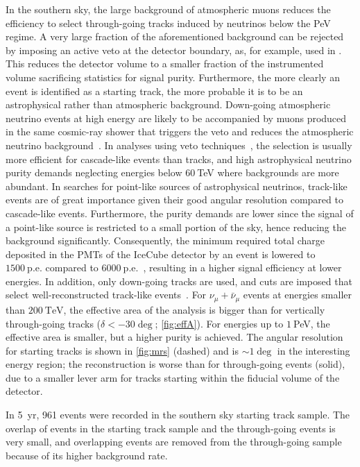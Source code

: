 \documentclass[aps,10pt,prd,twocolumn,floats,letterpaper,showpacs,nofootinbib,bibnotes,notitlepage,superscriptaddress]{revtex4-1}
\begin{document}
In the southern sky, the large background of atmospheric muons reduces the
efficiency to select through-going tracks induced by neutrinos below the PeV
regime. A very large fraction of the aforementioned background can be rejected
by imposing an active veto at the detector boundary, as, for example, used in
\cite{Aartsen:2013jdh}. This reduces the detector volume to a smaller fraction
of the instrumented volume sacrificing statistics for signal purity.
Furthermore, the more clearly an event is identified as a starting track, the
more probable it is to be an astrophysical rather than atmospheric background.
Down-going atmospheric neutrino events at high energy are likely to be
accompanied by muons produced in the same cosmic-ray shower that triggers the
veto and reduces the atmospheric neutrino background~\citep{Schonert:2008is,
Gaisser:2014bja}. In analyses using veto techniques~\citep{Aartsen:2013jdh,
Aartsen:2014muf}, the selection is usually more efficient for cascade-like
events than tracks, and high astrophysical neutrino purity demands neglecting
energies below $60\:$TeV where backgrounds are more abundant.  In searches for
point-like sources of astrophysical neutrinos, track-like events are of great
importance given their good angular resolution compared to cascade-like events.
Furthermore, the purity demands are lower since the signal of a point-like
source is restricted to a small portion of the sky, hence reducing the
background significantly. Consequently, the minimum required total charge
deposited in the PMTs of the IceCube detector by an event is lowered to
$1500\:\mathrm{p.e.}$ compared to
$6000\:\mathrm{p.e.}$~\citep{Aartsen:2013jdh}, resulting in a higher signal
efficiency at lower energies. In addition, only down-going tracks are used, and
cuts are imposed that select well-reconstructed track-like
events~\citep{Aartsen:2016tpb}. For $\nu_\mu+\bar{\nu}_\mu$ events at energies
smaller than $200\:\mathrm{TeV}$, the effective area of the analysis is bigger
than for vertically through-going tracks
($\delta<-30\deg$; \ref{fig:effA}).  For energies up to
$1\:$PeV, the effective area is smaller, but a higher purity is achieved.  The
angular resolution for starting tracks is shown in \ref{fig:mrs} (dashed)
and is $\sim1\deg$ in the interesting energy region; the reconstruction is
worse than for through-going events (solid), due to a smaller lever arm for
tracks starting within the fiducial volume of the detector.

In 5~yr, 961 events were recorded in the southern sky starting track
sample. The overlap of events in the starting track sample and the
through-going events is very small, and overlapping events are removed from the
through-going sample because of its higher background rate.
\end{document}
